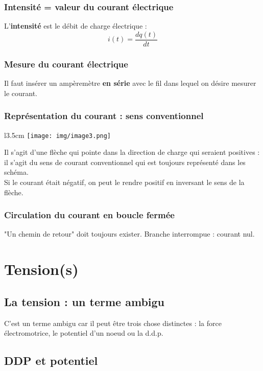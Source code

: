 \documentclass[11pt, a4paper, openany]{book}
\begin{document}
		\subsubsection{Intensité = valeur du courant électrique}
		L'\textbf{intensité} est le débit de charge électrique :
		\begin{equation}
		i(t) = \frac{dq(t)}{dt}
		\end{equation}
		
		\subsubsection{Mesure du courant électrique}
		Il faut insérer un ampèremètre \textbf{en série} avec le fil dans lequel on désire mesurer le courant.
		
		\subsubsection{Représentation du courant : sens conventionnel}
		\begin{wrapfigure}[5]{l}{3.5cm}
			\texttt{[image: img/image3.png]}
		\end{wrapfigure}
		Il s'agit d'une flèche qui pointe dans la direction de charge qui seraient positives : il s'agit du sens de courant conventionnel qui est toujours représenté dans les schéma.\\
		Si le courant était négatif, on peut le rendre positif en inversant le sens de la flèche.
		
		\subsubsection{Circulation du courant en boucle fermée}
		"Un chemin de retour" doit toujours exister. Branche interrompue : courant nul.
		
		\section{Tension(s)}
		\subsection{La tension : un terme ambigu}
		C'est un terme ambigu car il peut être trois chose distinctes : la force électromotrice, le potentiel d'un noeud ou la d.d.p.
		
		\subsection{DDP et potentiel}
\end{document}
